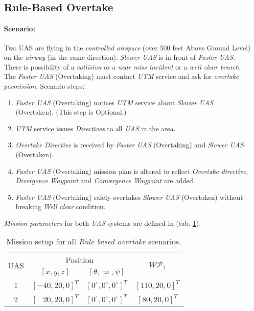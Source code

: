 \subsection{Rule-Based Overtake}\label{s:testRuleOvertake}
    \paragraph{Scenario:} Two UAS are flying in the \emph{controlled airspace} (over 500 feet Above Ground Level) on the \emph{airway} (in the same direction). \emph{Slower UAS} is in front of \emph{Faster UAS}. There is possibility of a \emph{collision} or a \emph{near miss incident} or a \emph{well clear breach}. The \emph{Faster UAS} (Overtaking) must contact \emph{UTM} service and ask for \emph{overtake permission}. Scenario steps:
    
    \begin{enumerate}
        \item \emph{Faster UAS} (Overtaking) notices \emph{UTM} service about \emph{Slower UAS} (Overtaken). (This step is Optional.)
        
        \item \emph{UTM} service issues \emph{Directives} to all \emph{UAS} in the area.
        
        \item \emph{Overtake Directive} is received by \emph{Faster UAS} (Overtaking) and \emph{Slower UAS} (Overtaken).
        
        \item \emph{Faster UAS} (Overtaking) mission plan is altered to reflect \emph{Overtake directive}, \emph{Divergence Waypoint} and \emph{Convergence Waypoint} are added.
        
        \item \emph{Faster UAS} (Overtaking) safely overtakes \emph{Slower UAS} (Overtaken) without breaking \emph{Well clear} condition.
    \end{enumerate}
    
    \noindent\emph{Mission parameters} for both \emph{UAS} systems are defined in (tab. \ref{tab:missionSetupRuleBasedOvertakeScenarios}).
    
    \begin{table}[H]
        \centering
        \begin{tabular}{c||c|c||c}
            \multirow{2}{*}{UAS} &\multicolumn{2}{c||}{Position} & \multirow{2}{*}{$\mathscr{WP}_1$} \\\cline{2-3}
              & $[x,y,z]$           & $[\theta,\varpi,\psi]$           & \\\hline\hline
            1 & $[-40,20,0]^T $       & $[0^\circ,0^\circ,0^\circ]^T$    & $[110,20,0]^T$\\\hline 
            2 & $[-20,20,0]^T $       & $[0^\circ,0^\circ,0^\circ]^T$    & $[80,20,0]^T$\\
        \end{tabular}
        \caption{Mission setup for all \emph{Rule based overtake} scenarios.}
        \label{tab:missionSetupRuleBasedOvertakeScenarios}
    \end{table}


